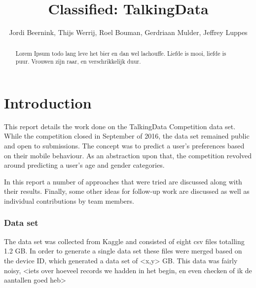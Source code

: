 \documentclass[runningheads,a4paper]{llncs}
\begin{document}
\mainmatter 

\title{Classified: TalkingData}


\author{Jordi Beernink, Thijs Werrij, Roel Bouman, Gerdriaan Mulder, Jeffrey Luppes}



\tocauthor{{}}

\maketitle

\begin{abstract}
Lorem Ipsum todo lang leve het bier en dan wel lachouffe. Liefde is mooi, liefde is puur. Vrouwen zijn raar, en verschrikkelijk duur. 
\end{abstract}

\medskip

\begingroup
\let\clearpage\relax
\tableofcontents
{}
\endgroup

\medskip
\medskip

\section{Introduction}
This report details the work done on the TalkingData Competition data set. While the competition closed in September of 2016,  the data set remained public and open to submissions. The concept was to predict a user's preferences based on their mobile behaviour. As an abstraction upon that, the competition revolved around predicting a user's age and gender categories. 

In this report a number of approaches that were tried are discussed along with their results. Finally, some other ideas for follow-up work are discussed as well as individual contributions by team members.
\subsubsection{Data set}
The data set was collected from Kaggle and consisted of eight csv files totalling 1.2 GB. In order to generate a single data set these files were merged based on the device ID, which generated a data set of <x,y> GB. This data was fairly noisy, <iets over hoeveel records we hadden in het begin, en even checken of ik de aantallen goed heb> 
\end{document}

